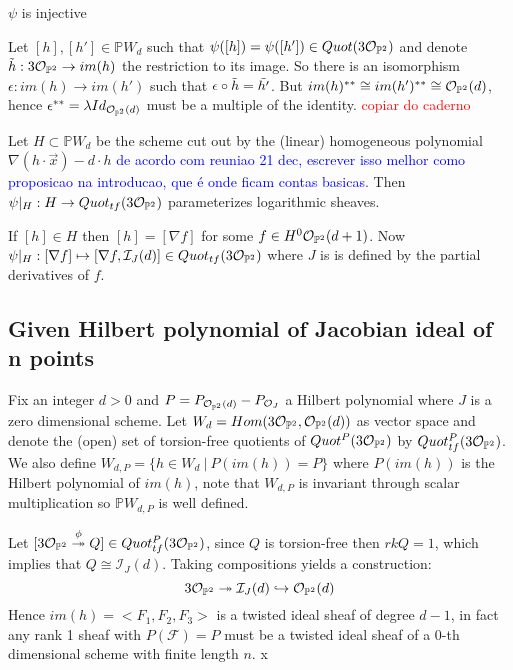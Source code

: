 \begin{proposition}
$\psi$ is injective
\end{proposition}
\begin{dem*}
Let $[h],[h'] \in \mathbb{P}W_d$ such that $\psi([h])=\psi([h']) \in Quot(3\mathcal{O}_{\mathbb{P}^2})$ and denote $\Tilde{h}:3\mathcal{O}_{\mathbb{P}^2} \to im(h)$ the restriction to its image. So there is an isomorphism $\epsilon:im(h) \to im(h')$ such that $\epsilon \circ \Tilde{h} = \Tilde{h'}$. But $im(h)^{**} \cong im(h')^{**} \cong \mathcal{O}_{\mathbb{P}^2}(d)$, hence $\epsilon^{**} = \lambda Id_{\mathcal{O}_{\mathbb{P}^2}(d)}$ must be a multiple of the identity.
\textcolor{red}{copiar do caderno}
\end{dem*}

\begin{definition}
Let $H \subset \mathbb{P}W_d$ be the scheme cut out by the (linear) homogeneous polynomial $\nabla(h \cdot \overrightarrow{x})-d\cdot h$ \textcolor{blue}{de acordo com reuniao 21 dec, escrever isso melhor como proposicao na introducao, que é onde ficam contas basicas}. Then $\psi|_H: H \to Quot_{tf}(3\mathcal{O}_{\mathbb{P}^2})$ parameterizes logarithmic sheaves.
\end{definition}
\begin{dem*}
If $[h] \in H$ then $[h] = [\nabla f]$ for some $f \in H^0\mathcal{O}_{\mathbb{P}^2}(d+1)$. Now $\psi|_H: [\nabla f] \mapsto [\nabla f,\mathcal{I}_J(d)] \in Quot_{tf}(3\mathcal{O}_{\mathbb{P}^2})$ where $J$ is is defined by the partial derivatives of $f$.
\end{dem*}

\subsection{Given Hilbert polynomial of Jacobian ideal of n points}
Fix an integer $d > 0$ and $P = P_{\mathcal{O}_{\mathbb{P}^2}(d)}-P_{\mathcal{O}_J}$ a Hilbert polynomial where $J$ is a zero dimensional scheme. Let $W_d = Hom(3\mathcal{O}_{\mathbb{P}^2},\mathcal{O}_{\mathbb{P}^2}(d))$ as vector space and denote the (open) set of torsion-free quotients of $Quot^P(3\mathcal{O}_{\mathbb{P}^2})$ by $Quot_{tf}^P(3 \mathcal{O}_{\mathbb{P}^2})$.
We also define $W_{d,P} = \{h \in W_d \ | \ P(im(h)) = P \}$ where $P(im(h))$ is the Hilbert polynomial of $im(h)$, note that $W_{d,P}$ is invariant through scalar multiplication so $\mathbb{P}W_{d,P}$ is well defined.

Let $[3 \mathcal{O}_{\mathbb{P}^2} \overset{\phi}{\twoheadrightarrow} Q] \in Quot_{tf}^P(3\mathcal{O}_{\mathbb{P}^2})$, since $Q$ is torsion-free then $rk Q = 1$, which implies that $Q \cong \mathcal{I}_J (d)$. Taking compositions yields a construction:  
\begin{equation}
    3\mathcal{O}_{\mathbb{P}^2} \twoheadrightarrow \mathcal{I}_J(d) \hookrightarrow \mathcal{O}_{\mathbb{P}^2}(d)
\end{equation}
Hence $im(h) = <F_1,F_2,F_3>$ is a twisted ideal sheaf of degree $d-1$, in fact any rank 1 sheaf with $P(\mathcal{F}) = P$ must be a twisted ideal sheaf of a $0$-th dimensional scheme with finite length $n$.
x

